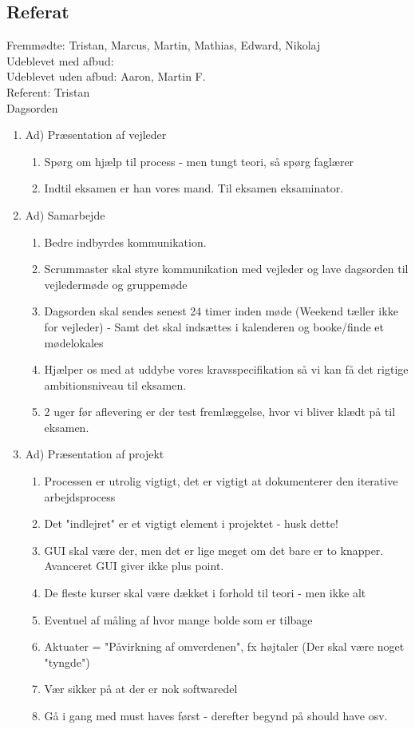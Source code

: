  \subsection{Referat}
 Fremmødte: Tristan, Marcus, Martin, Mathias, Edward, Nikolaj 
 \\Udeblevet med afbud:
 \\Udeblevet uden afbud: Aaron, Martin F.
 \\Referent: Tristan 
 \\Dagsorden 
 \begin{enumerate}
    \item Ad) Præsentation af vejleder
    \begin{enumerate}
        \item Spørg om hjælp til process - men tungt teori, så spørg faglærer 
        \item Indtil eksamen er han vores mand. Til eksamen eksaminator.
    \end{enumerate}
     
    \item Ad) Samarbejde
    \begin{enumerate}
        \item Bedre indbyrdes kommunikation.
        \item Scrummaster skal styre kommunikation med vejleder og lave dagsorden til vejledermøde og gruppemøde
        \item Dagsorden skal sendes senest 24 timer inden møde (Weekend tæller ikke for vejleder) - Samt det skal indsættes i kalenderen og booke/finde et mødelokales
        \item Hjælper os med at uddybe vores kravsspecifikation så vi kan få det rigtige ambitionsniveau til eksamen.
        \item 2 uger før aflevering er der test fremlæggelse, hvor vi bliver klædt på til eksamen.
    \end{enumerate} 
    
    \item Ad) Præsentation af projekt
    \begin{enumerate}
        \item Processen er utrolig vigtigt, det er vigtigt at dokumenterer den iterative arbejdsprocess 
        \item Det "indlejret" er et vigtigt element i projektet - husk dette!
        \item GUI skal være der, men det er lige meget om det bare er to knapper. Avanceret GUI giver ikke plus point.
        \item De fleste kurser skal være dækket i forhold til teori - men ikke alt 
        \item Eventuel af måling af hvor mange bolde som er tilbage 
        \item Aktuater = "Påvirkning af omverdenen", fx højtaler (Der skal være noget "tyngde") 
        \item Vær sikker på at der er nok softwaredel 
        \item Gå i gang med must haves først - derefter begynd på should have osv.
    \end{enumerate}
    

\end{enumerate}
